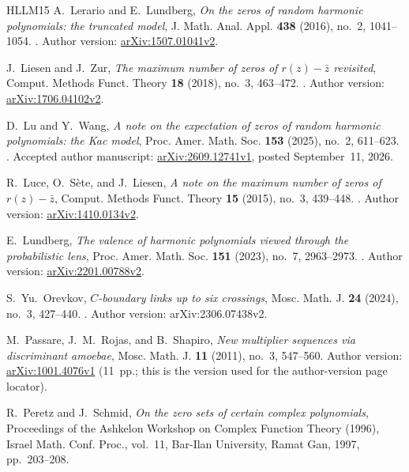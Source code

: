 \documentclass[UTF8,11pt]{ctexart}
\theoremstyle{definition}
\numberwithin{equation}{section}
\begin{document}
\begin{thebibliography}{HLLM15}
A.~Lerario and E.~Lundberg,
\emph{On the zeros of random harmonic polynomials: the truncated model},
J. Math. Anal. Appl. \textbf{438} (2016), no.~2, 1041--1054.
.
Author version: \href{https://arxiv.org/abs/1507.01041v2}{arXiv:1507.01041v2}.

J.~Liesen and J.~Zur,
\emph{The maximum number of zeros of $r(z)-\bar z$ revisited},
Comput. Methods Funct. Theory \textbf{18} (2018), no.~3, 463--472.
.
Author version: \href{https://arxiv.org/abs/1706.04102v2}{arXiv:1706.04102v2}.

D.~Lu and Y.~Wang,
\emph{A note on the expectation of zeros of random harmonic polynomials:
the Kac model},
Proc. Amer. Math. Soc. \textbf{153} (2025), no.~2, 611--623.
.
Accepted author manuscript: \href{https://arxiv.org/abs/2609.12741v1}{arXiv:2609.12741v1},
posted September~11, 2026.

R.~Luce, O.~S\`ete, and J.~Liesen,
\emph{A note on the maximum number of zeros of $r(z)-\bar z$},
Comput. Methods Funct. Theory \textbf{15} (2015), no.~3, 439--448.
.
Author version: \href{https://arxiv.org/abs/1410.0134v2}{arXiv:1410.0134v2}.

E.~Lundberg,
\emph{The valence of harmonic polynomials viewed through the probabilistic lens},
Proc. Amer. Math. Soc. \textbf{151} (2023), no.~7, 2963--2973.
.
Author version: \href{https://arxiv.org/abs/2201.00788v2}{arXiv:2201.00788v2}.

S.~Yu.~Orevkov,
\emph{$C$-boundary links up to six crossings},
Mosc. Math. J. \textbf{24} (2024), no.~3, 427--440.
.
Author version: arXiv:2306.07438v2.

M.~Passare, J.~M.~Rojas, and B.~Shapiro,
\emph{New multiplier sequences via discriminant amoebae},
Mosc. Math. J. \textbf{11} (2011), no.~3, 547--560.
Author version: \href{https://arxiv.org/abs/1001.4076v1}{arXiv:1001.4076v1}
(11~pp.; this is the version used for the author-version page locator).

R.~Peretz and J.~Schmid,
\emph{On the zero sets of certain complex polynomials},
Proceedings of the Ashkelon Workshop on Complex Function Theory (1996),
Israel Math. Conf. Proc., vol.~11, Bar-Ilan University, Ramat Gan, 1997,
pp.~203--208.


\end{thebibliography}
\end{document}
